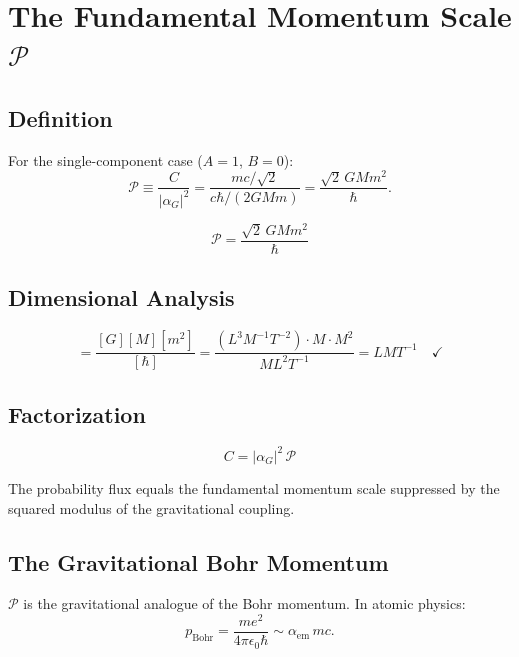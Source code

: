 \documentclass[11pt,a4paper]{article}
\theoremstyle{definition}
\theoremstyle{remark}
\begin{document}
	\section{The Fundamental Momentum Scale $\mathcal{P}$}
	
	\subsection{Definition}
	
	For the single-component case ($A=1$, $B=0$):
	\begin{equation}
		\mathcal{P} \equiv \frac{C}{|\alpha_G|^2} = \frac{mc/\sqrt{2}}{c\hbar/(2GMm)} = \frac{\sqrt{2}\,GMm^2}{\hbar}.
	\end{equation}
	
	\begin{equation}
		\boxed{\mathcal{P} = \frac{\sqrt{2}\,GMm^2}{\hbar}}
		\label{eq:B_final}
	\end{equation}
	
	\subsection{Dimensional Analysis}
	
	\begin{equation}
		[\mathcal{P}] = \frac{[G][M][m^2]}{[\hbar]} = \frac{(L^3M^{-1}T^{-2})\cdot M\cdot M^2}{ML^2T^{-1}} = LMT^{-1} \quad\checkmark
	\end{equation}
	
	\subsection{Factorization}
	
	\begin{equation}
		\boxed{C = |\alpha_G|^2\,\mathcal{P}}
		\label{eq:C_factorization}
	\end{equation}
	
	The probability flux equals the fundamental momentum scale suppressed by the squared modulus of the gravitational coupling.
	
	\subsection{The Gravitational Bohr Momentum}
	
	$\mathcal{P}$ is the gravitational analogue of the Bohr momentum.  In atomic physics:
	\begin{equation}
		p_{\mathrm{Bohr}} = \frac{me^2}{4\pi\epsilon_0\hbar} \sim \alpha_{\mathrm{em}}\,mc.
	\end{equation}
	
\end{document}
